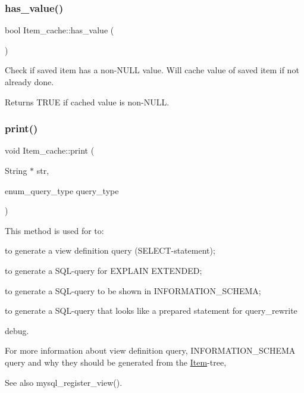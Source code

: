 \subsubsection{\texorpdfstring{has\+\_\+value()}{has\_value()}}
{\footnotesize\ttfamily bool Item\+\_\+cache\+::has\+\_\+value (\begin{DoxyParamCaption}{ }\end{DoxyParamCaption})}

Check if saved item has a non-\/N\+U\+LL value. Will cache value of saved item if not already done. \begin{DoxyReturn}{Returns}
T\+R\+UE if cached value is non-\/N\+U\+LL. 
\end{DoxyReturn}
\mbox{\label{classItem__cache_aecabd691684004d947417423448a4ff3}} 
\subsubsection{\texorpdfstring{print()}{print()}}
{\footnotesize\ttfamily void Item\+\_\+cache\+::print (\begin{DoxyParamCaption}\item[{String $\ast$}]{str,  }\item[{enum\+\_\+query\+\_\+type}]{query\+\_\+type }\end{DoxyParamCaption})\hspace{0.3cm}{\ttfamily [virtual]}}

This method is used for to\+:
\begin{DoxyItemize}
\item to generate a view definition query (S\+E\+L\+E\+CT-\/statement);
\item to generate a S\+QL-\/query for E\+X\+P\+L\+A\+IN E\+X\+T\+E\+N\+D\+ED;
\item to generate a S\+QL-\/query to be shown in I\+N\+F\+O\+R\+M\+A\+T\+I\+O\+N\+\_\+\+S\+C\+H\+E\+MA;
\item to generate a S\+QL-\/query that looks like a prepared statement for query\+\_\+rewrite
\item debug.
\end{DoxyItemize}

For more information about view definition query, I\+N\+F\+O\+R\+M\+A\+T\+I\+O\+N\+\_\+\+S\+C\+H\+E\+MA query and why they should be generated from the \mbox{\hyperlink{classItem}{Item}}-\/tree, \begin{DoxySeeAlso}{See also}
mysql\+\_\+register\+\_\+view(). 
\end{DoxySeeAlso}


